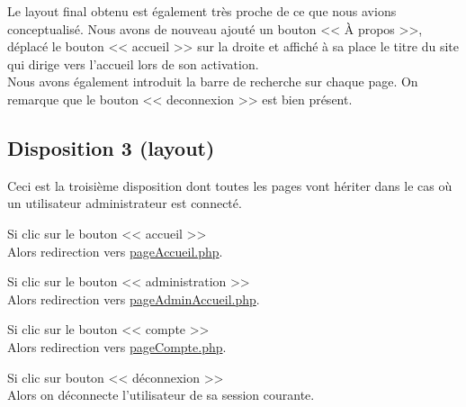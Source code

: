 
        \begin{paragraphe}
            Le layout final obtenu est également très proche de ce que nous avions conceptualisé. Nous avons de nouveau ajouté un bouton << À propos >>,
            déplacé le bouton << accueil >> sur la droite et affiché à sa place le titre du site qui dirige vers l'accueil lors de son activation.\\
            Nous avons également introduit la barre de recherche sur chaque page. On remarque que le bouton << deconnexion >> est bien présent.
        \end{paragraphe}


	\newpage

	\subsection{Disposition 3 (layout)}

		\begin{paragraphe}
            Ceci est la troisième disposition dont toutes les pages vont hériter dans le cas où un utilisateur administrateur est connecté.
		\end{paragraphe}

		\begin{paragraphe}
			Si clic sur le bouton << accueil >> \\
			Alors redirection vers \underline{pageAccueil.php}.
		\end{paragraphe}

		\begin{paragraphe}
			Si clic sur le bouton << administration >> \\
			Alors redirection vers \underline{pageAdminAccueil.php}.
		\end{paragraphe}

		\begin{paragraphe}
			Si clic sur le bouton << compte >> \\
			Alors redirection vers \underline{pageCompte.php}.
		\end{paragraphe}

		\begin{paragraphe}
			Si clic sur bouton << déconnexion >> \\
			Alors on déconnecte l'utilisateur de sa session courante.
		\end{paragraphe}

